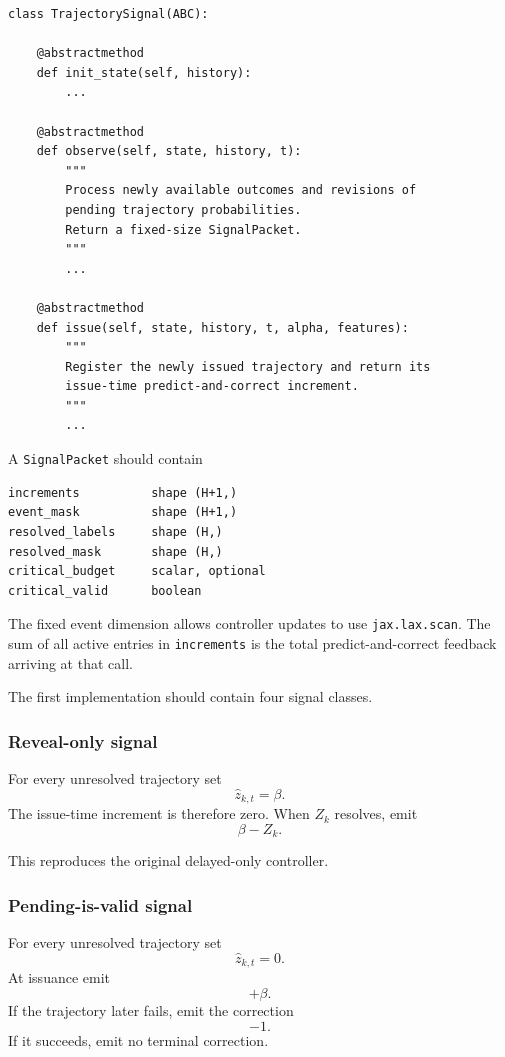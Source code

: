 \documentclass[11pt]{article}
\begin{document}
\begin{verbatim}
class TrajectorySignal(ABC):

    @abstractmethod
    def init_state(self, history):
        ...

    @abstractmethod
    def observe(self, state, history, t):
        """
        Process newly available outcomes and revisions of
        pending trajectory probabilities.
        Return a fixed-size SignalPacket.
        """
        ...

    @abstractmethod
    def issue(self, state, history, t, alpha, features):
        """
        Register the newly issued trajectory and return its
        issue-time predict-and-correct increment.
        """
        ...
\end{verbatim}

A \texttt{SignalPacket} should contain

\begin{verbatim}
increments          shape (H+1,)
event_mask          shape (H+1,)
resolved_labels     shape (H,)
resolved_mask       shape (H,)
critical_budget     scalar, optional
critical_valid      boolean
\end{verbatim}

The fixed event dimension allows controller updates to use
\texttt{jax.lax.scan}.  The sum of all active entries in
\texttt{increments} is the total predict-and-correct feedback arriving at
that call.

The first implementation should contain four signal classes.

\subsubsection{Reveal-only signal}

For every unresolved trajectory set
\[
    \widehat z_{k,t}=\beta.
\]
The issue-time increment is therefore zero.  When $Z_k$ resolves, emit
\[
    \beta-Z_k.
\]

This reproduces the original delayed-only controller.

\subsubsection{Pending-is-valid signal}

For every unresolved trajectory set
\[
    \widehat z_{k,t}=0.
\]
At issuance emit
\[
    +\beta.
\]
If the trajectory later fails, emit the correction
\[
    -1.
\]
If it succeeds, emit no terminal correction.
\end{document}
